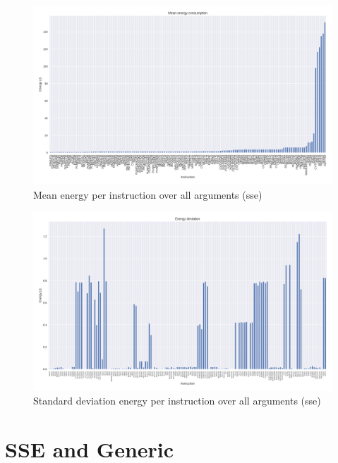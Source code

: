 \begin{figure}
	\centering
	\includegraphics[width=\textwidth]{experiments/figures/inst_mean_en_sse.png}
	\caption{Mean energy per instruction over all arguments (sse)}
	\label{fig:experiment_en5}
\end{figure}

\begin{figure}
	\centering
	\includegraphics[width=\textwidth]{experiments/figures/inst_std_en_sse.png}
	\caption{Standard deviation energy per instruction over all arguments (sse)}
	\label{fig:experiment_en6}
\end{figure}

\section{SSE and Generic}

